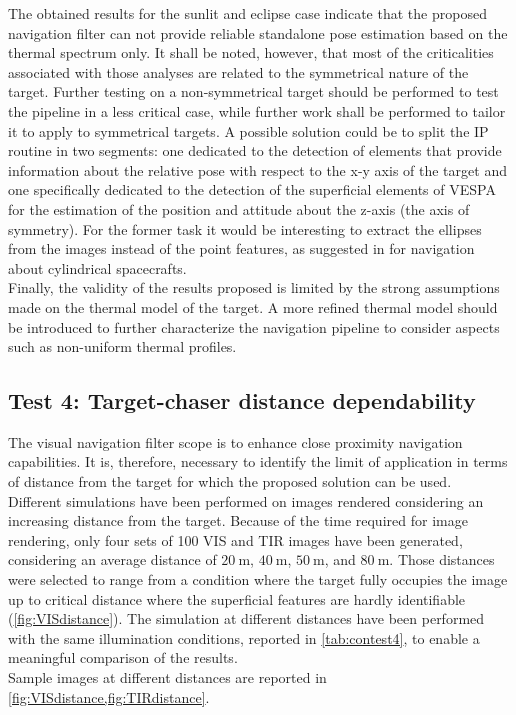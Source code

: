 The obtained results for the sunlit and eclipse case indicate that the proposed navigation filter can not provide reliable standalone pose estimation based on the thermal spectrum only. It shall be noted, however, that most of the criticalities associated with those analyses are related to the symmetrical nature of the target. Further testing on a non-symmetrical target should be performed to test the pipeline in a less critical case, while further work shall be performed to tailor it to apply to symmetrical targets. A possible solution could be to split the IP routine in two segments: one dedicated to the detection of elements that provide information about the relative pose with respect to the x-y axis of the target and one specifically dedicated to the detection of the superficial elements of VESPA for the estimation of the position and attitude about the z-axis (the axis of symmetry). For the former task it would be interesting to extract the ellipses from the images instead of the point features, as suggested in \cite{liu2014relative} for navigation about cylindrical spacecrafts.\\
Finally, the validity of the results proposed is limited by the strong assumptions made on the thermal model of the target. A more refined thermal model should be introduced to further characterize the navigation pipeline to consider aspects such as non-uniform thermal profiles. 


\subsection{Test 4: Target-chaser distance dependability }
The visual navigation filter scope is to enhance close proximity navigation capabilities. It is, therefore, necessary to identify the limit of application in terms of distance from the target for which the proposed solution can be used. \\
Different simulations have been performed on images rendered considering an increasing distance from the target. Because of the time required for image rendering, only four sets of 100 VIS and TIR images have been generated, considering an average distance of $\SI{20}{\meter}$, $\SI{40}{\meter}$, $\SI{50}{\meter}$, and $\SI{80}{\meter}$. Those distances were selected to range from a condition where the target fully occupies the image up to critical distance where the superficial features are hardly identifiable (\cref{fig:VISdistance}). The simulation at different distances have been performed with the same illumination conditions, reported in \cref{tab:contest4}, to enable a meaningful comparison of the results.\\
Sample images at different distances are reported in \cref{fig:VISdistance,fig:TIRdistance}.\\

